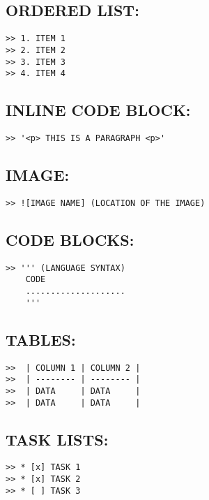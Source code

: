 \documentclass[11pt,british]{article}
\begin{document}
\subsection{ORDERED LIST:}
\begin{verbatim}
>> 1. ITEM 1
>> 2. ITEM 2
>> 3. ITEM 3
>> 4. ITEM 4
\end{verbatim}

\subsection{INLINE CODE BLOCK:}
\begin{verbatim}
>> '<p> THIS IS A PARAGRAPH <p>'
\end{verbatim}

\subsection{IMAGE:}
\begin{verbatim}
>> ![IMAGE NAME] (LOCATION OF THE IMAGE)
\end{verbatim}

\subsection{CODE BLOCKS:}
\begin{verbatim}
>> ''' (LANGUAGE SYNTAX)
	CODE 
	....................
	'''
\end{verbatim}

\subsection{TABLES:}
\begin{verbatim}
>>  | COLUMN 1 | COLUMN 2 |
>>  | -------- | -------- |
>>  | DATA     | DATA     |
>>  | DATA     | DATA     |
\end{verbatim}

\subsection{TASK LISTS:}
\begin{verbatim}
>> * [x] TASK 1
>> * [x] TASK 2
>> * [ ] TASK 3
\end{verbatim}
\end{document}
